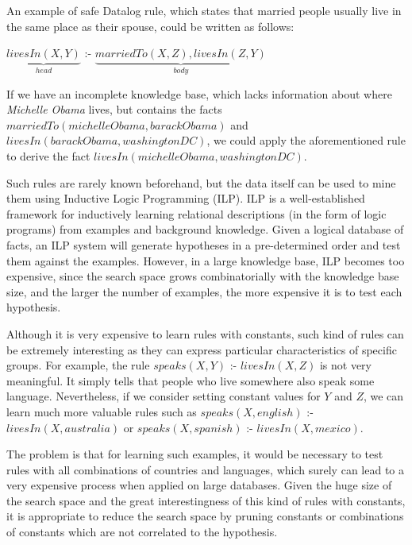 An example of safe Datalog rule, which states that married people usually live in the same place as their spouse,
could be written as follows:

\begin{center}
  $\underbrace{livesIn(X,Y)}_{head}$ :- $\underbrace{marriedTo(X,Z),livesIn(Z,Y)}_{body}$
\end{center}

If we have an incomplete knowledge base, which lacks information about where \emph{Michelle Obama} lives, but
contains the facts $marriedTo(michelleObama,barackObama)$ and $livesIn(barackObama,washingtonDC)$, we could apply the
aforementioned rule to derive the fact $livesIn(michelleObama, washingtonDC)$. 



Such rules are rarely known beforehand, but the data itself can be used to mine them using Inductive Logic
Programming (ILP). ILP is a well-established framework for inductively learning relational descriptions (in the form
of logic programs) from examples and background knowledge. Given a logical database of facts, an ILP system will
generate hypotheses in a pre-determined order and test them against the examples. However, in a large knowledge base,
ILP becomes too expensive, since the search space grows combinatorially with the knowledge base size, and the larger the
number of examples, the more expensive it is to test each hypothesis.

Although it is very expensive to learn rules with constants, such kind of rules can be extremely interesting as they
can express particular characteristics of specific groups. For example, the rule $speaks(X,Y)$ :- $livesIn(X,Z)$ is not
very meaningful. It simply tells that people who live somewhere also speak some language. Nevertheless, if we
consider setting constant values for $Y$ and $Z$, we can learn much more valuable rules such as
$speaks(X,english)$ :- $livesIn(X,australia)$ or $speaks(X,spanish)$ :- $livesIn(X,mexico)$.

The problem is that for learning such examples, it would be necessary to test rules with all combinations of
countries and languages, which surely can lead to a very expensive process when applied on large databases. Given the
huge size of the search space and the great interestingness of this kind of rules with constants, it is appropriate to
reduce the search space by pruning constants or combinations of constants which are not correlated to the
hypothesis.

